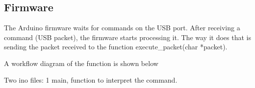 \documentclass[12pt,a4paper]{report}
\begin{document}
\subsection*{Firmware}
The Arduino firmware waits for commands on the USB port. After receiving a command (USB packet), the firmware starts processing it. The way it does that is sending the packet received to the function execute\_packet(char *packet).

A workflow diagram of the function is shown below

Two ino files: 1 main, function to interpret the command.
\end{document}
